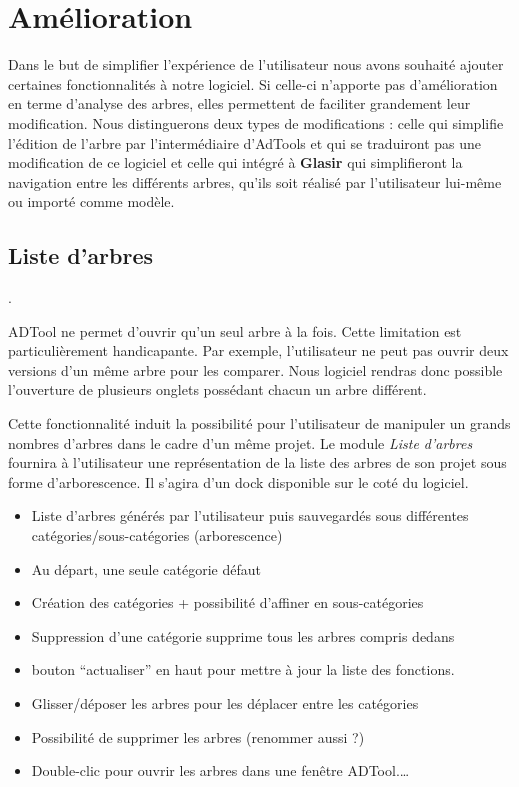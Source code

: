 \section{Amélioration}


	Dans le but de simplifier l'expérience de l'utilisateur nous avons souhaité ajouter certaines fonctionnalités à notre logiciel. Si celle-ci n'apporte pas d'amélioration en terme d'analyse des arbres, elles permettent de faciliter grandement leur modification. Nous distinguerons deux types de modifications : celle qui simplifie l'édition de l'arbre par l’intermédiaire d'AdTools et qui se traduiront pas une modification de ce logiciel et celle qui intégré à \textbf{Glasir} qui simplifieront la navigation entre les différents arbres, qu'ils soit réalisé par l'utilisateur lui-même ou importé comme modèle. 




	\subsection{Liste d'arbres}.

		ADTool ne permet d'ouvrir qu'un seul arbre à la fois. Cette limitation est particulièrement handicapante. Par exemple, l'utilisateur ne peut pas ouvrir deux versions d'un même arbre pour les comparer. Nous logiciel rendras donc possible l'ouverture de plusieurs onglets possédant chacun un arbre différent. 

		Cette fonctionnalité induit la possibilité pour l'utilisateur de manipuler un grands nombres d'arbres dans le cadre d'un même projet. Le module \emph{Liste d'arbres} fournira à l'utilisateur une représentation de la liste des arbres de son projet sous forme d'arborescence. Il s'agira d'un dock disponible sur le coté du logiciel.

		\begin{itemize}
			\item Liste d'arbres générés par l'utilisateur puis sauvegardés sous différentes catégories/sous-catégories (arborescence)
			\item Au départ, une seule catégorie défaut
			\item  Création des catégories + possibilité d'affiner en sous-catégories
			\item Suppression d'une catégorie supprime tous les arbres compris dedans
			\item bouton “actualiser” en haut pour mettre à jour la liste des fonctions.
			\item Glisser/déposer les arbres pour les déplacer entre les catégories
			\item Possibilité de supprimer les arbres (renommer aussi ?)
			\item Double-clic pour ouvrir les arbres dans une fenêtre ADTool.\ldots
		\end{itemize}
		

